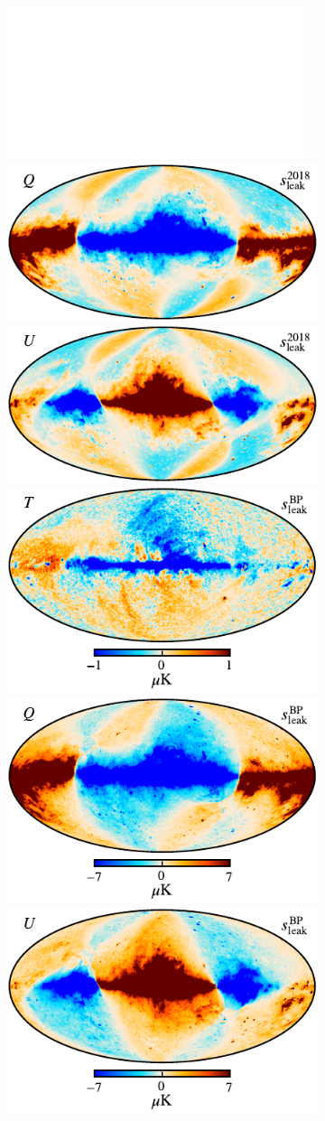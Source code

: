\documentclass[twocolumn]{aa}
\newcommand{\?}[1]{\textcolor{red}{{\bf [#1]}}}
\begin{document}
  \begin{figure}[p] %
    \center
    \begin{subfigure}[t]{\linewidth}
      \includegraphics[width=0.32\linewidth]{figs/whitemap.pdf}
      \includegraphics[width=0.32\linewidth]{figs/tod_030_bpcorr_DPC_Q_STOKES_w8_n1024_60arcmin_c-planck.pdf}
      \includegraphics[width=0.32\linewidth]{figs/tod_030_bpcorr_DPC_U_STOKES_w8_n1024_60arcmin_c-planck.pdf}\\
      \includegraphics[width=0.32\linewidth]{figs/tod_030_bpcorr_c0001_k000251_I_Stokes_w8_n512_60arcmin_cb_c-planck.pdf}
      \includegraphics[width=0.32\linewidth]{figs/tod_030_bpcorr_c0001_k000251_Q_Stokes_w8_n512_60arcmin_cb_c-planck.pdf}
      \includegraphics[width=0.32\linewidth]{figs/tod_030_bpcorr_c0001_k000251_U_Stokes_w8_n512_60arcmin_cb_c-planck.pdf}

\end{subfigure}
\end{figure}
\end{document}
